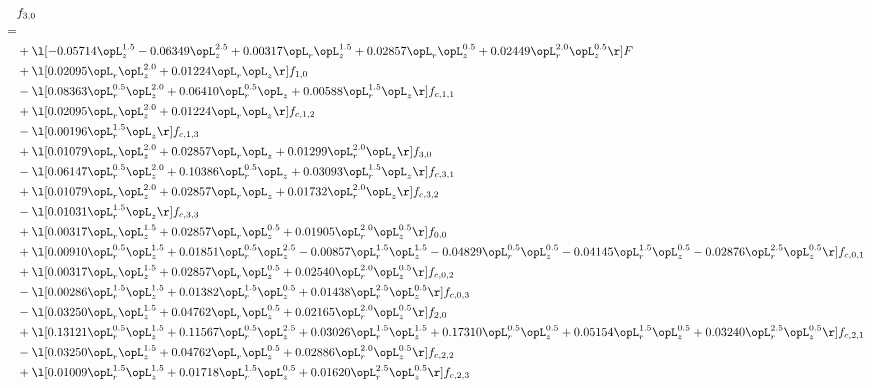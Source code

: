 \begin{alignat}{2} 
\label{eq:f_30_1} 
& f_{3,0} \nonumber \\ 
 = \\ 
& + \l[  -0.05714 \opL_z^{1.5}   -0.06349 \opL_z^{2.5} +  0.00317 \opL_r \opL_z^{1.5} +  0.02857 \opL_r \opL_z^{0.5} +  0.02449 \opL_r^{2.0} \opL_z^{0.5}  \r] F \nonumber \\ 
& + \l[  0.02095 \opL_r \opL_z^{2.0} +  0.01224 \opL_r \opL_z  \r] f_{1,0} \nonumber \\ 
& - \l[  0.08363 \opL_r^{0.5} \opL_z^{2.0} +  0.06410 \opL_r^{0.5} \opL_z +  0.00588 \opL_r^{1.5} \opL_z  \r] f_{c,1,1} \nonumber \\ 
& + \l[  0.02095 \opL_r \opL_z^{2.0} +  0.01224 \opL_r \opL_z  \r] f_{c,1,2} \nonumber \\ 
& - \l[  0.00196 \opL_r^{1.5} \opL_z  \r] f_{c,1,3} \nonumber \\ 
& + \l[  0.01079 \opL_r \opL_z^{2.0} +  0.02857 \opL_r \opL_z +  0.01299 \opL_r^{2.0} \opL_z  \r] f_{3,0} \nonumber \\ 
& - \l[  0.06147 \opL_r^{0.5} \opL_z^{2.0} +  0.10386 \opL_r^{0.5} \opL_z +  0.03093 \opL_r^{1.5} \opL_z  \r] f_{c,3,1} \nonumber \\ 
& + \l[  0.01079 \opL_r \opL_z^{2.0} +  0.02857 \opL_r \opL_z +  0.01732 \opL_r^{2.0} \opL_z  \r] f_{c,3,2} \nonumber \\ 
& - \l[  0.01031 \opL_r^{1.5} \opL_z  \r] f_{c,3,3} \nonumber \\ 
& + \l[  0.00317 \opL_r \opL_z^{1.5} +  0.02857 \opL_r \opL_z^{0.5} +  0.01905 \opL_r^{2.0} \opL_z^{0.5}  \r] f_{0,0} \nonumber \\ 
& + \l[  0.00910 \opL_r^{0.5} \opL_z^{1.5} +  0.01851 \opL_r^{0.5} \opL_z^{2.5}   -0.00857 \opL_r^{1.5} \opL_z^{1.5}   -0.04829 \opL_r^{0.5} \opL_z^{0.5}   -0.04145 \opL_r^{1.5} \opL_z^{0.5}   -0.02876 \opL_r^{2.5} \opL_z^{0.5}  \r] f_{c,0,1} \nonumber \\ 
& + \l[  0.00317 \opL_r \opL_z^{1.5} +  0.02857 \opL_r \opL_z^{0.5} +  0.02540 \opL_r^{2.0} \opL_z^{0.5}  \r] f_{c,0,2} \nonumber \\ 
& - \l[  0.00286 \opL_r^{1.5} \opL_z^{1.5} +  0.01382 \opL_r^{1.5} \opL_z^{0.5} +  0.01438 \opL_r^{2.5} \opL_z^{0.5}  \r] f_{c,0,3} \nonumber \\ 
& - \l[  0.03250 \opL_r \opL_z^{1.5} +  0.04762 \opL_r \opL_z^{0.5} +  0.02165 \opL_r^{2.0} \opL_z^{0.5}  \r] f_{2,0} \nonumber \\ 
& + \l[  0.13121 \opL_r^{0.5} \opL_z^{1.5} +  0.11567 \opL_r^{0.5} \opL_z^{2.5} +  0.03026 \opL_r^{1.5} \opL_z^{1.5} +  0.17310 \opL_r^{0.5} \opL_z^{0.5} +  0.05154 \opL_r^{1.5} \opL_z^{0.5} +  0.03240 \opL_r^{2.5} \opL_z^{0.5}  \r] f_{c,2,1} \nonumber \\ 
& - \l[  0.03250 \opL_r \opL_z^{1.5} +  0.04762 \opL_r \opL_z^{0.5} +  0.02886 \opL_r^{2.0} \opL_z^{0.5}  \r] f_{c,2,2} \nonumber \\ 
& + \l[  0.01009 \opL_r^{1.5} \opL_z^{1.5} +  0.01718 \opL_r^{1.5} \opL_z^{0.5} +  0.01620 \opL_r^{2.5} \opL_z^{0.5}  \r] f_{c,2,3} \nonumber \\ 
\end{alignat} 


